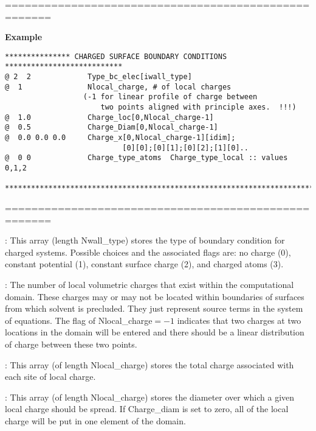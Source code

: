 \documentclass[10pt,onecolumn]{article}
\begin{document}
\noindent=====================================================

{\bf Example}

\begin{verbatim}
*************** CHARGED SURFACE BOUNDARY CONDITIONS ***************************
@ 2  2             Type_bc_elec[iwall_type]
@  1               Nlocal_charge, # of local charges
                  (-1 for linear profile of charge between
                      two points aligned with principle axes.  !!!)
@  1.0             Charge_loc[0,Nlocal_charge-1]
@  0.5             Charge_Diam[0,Nlocal_charge-1]
@  0.0 0.0 0.0     Charge_x[0,Nlocal_charge-1][idim];
                           [0][0];[0][1];[0][2];[1][0]..
@  0 0             Charge_type_atoms  Charge_type_local :: values 0,1,2

***********************************************************************
\end{verbatim}

\noindent=====================================================
\vspace{0.1in}


\vspace{0.1in}
:  This array (length Nwall\_type) stores the
type of boundary condition for charged systems.
Possible choices and the associated flags are:
no charge (0), constant potential (1), constant surface charge (2),
and charged atoms (3).


\vspace{0.1in}
:  The number of local volumetric charges that
exist within the computational domain.  These charges may or may not be
located within boundaries of surfaces from which solvent is
precluded. They just represent source terms in the system of
equations.  The flag of Nlocal\_charge$=-1$ indicates that two
charges at two locations in the domain will be entered and there
should be a linear distribution of charge between these two
points.

\vspace{0.1in}
:  This array (of length Nlocal\_charge) stores the
total charge associated with each site of local charge.

\vspace{0.1in}
:   This array (of length Nlocal\_charge) stores
the diameter over which a given local charge should be spread.  If
Charge\_diam is set to zero, all of the local charge will be put in one
element of the domain.
\end{document}
